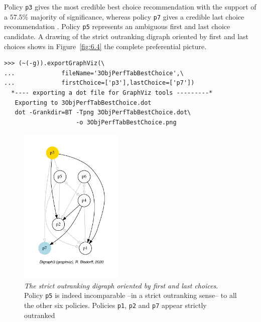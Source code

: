 Policy \texttt{p3} gives the most credible best choice recommendation with the support of a $57.5\%$ majority of significance, whereas policy \texttt{p7} gives a credible last choice recommendation . Policy \texttt{p5} represents an ambiguous first and last choice candidate. A drawing of the strict outranking digraph oriented by first and last choices shows in Figure~\vref{fig:6.4} the complete preferential picture.
\begin{lstlisting}
>>> (~(-g)).exportGraphViz(\
...             fileName='3ObjPerfTabBestChoice',\
...             firstChoice=['p3'],lastChoice=['p7'])
  *---- exporting a dot file for GraphViz tools ---------*
   Exporting to 3ObjPerfTabBestChoice.dot
   dot -Grankdir=BT -Tpng 3ObjPerfTabBestChoice.dot\
                    -o 3ObjPerfTabBestChoice.png
\end{lstlisting}
\begin{figure}[ht]
\sidecaption[t]
\includegraphics[width=5cm]{Figures/6-4-3ObjPerfTabBestChoice.pdf}
\caption[The strict outranking digraph oriented by first and last choices]{\emph{The strict outranking digraph oriented by first and last choices}. Policy \texttt{p5} is indeed incomparable --in a strict outranking sense-- to all the other six policies. Policies \texttt{p1}, \texttt{p2} and \texttt{p7} appear strictly outranked}
\label{fig:6.4}       %
\end{figure}

